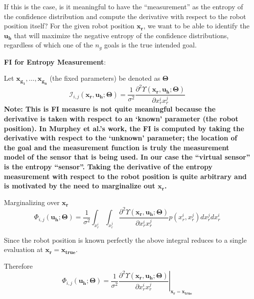 \documentclass[]{article}
\begin{document}
If this is the case, is it meaningful to have the ``measurement'' as the entropy of the confidence distribution and compute the derivative with respect to the robot position itself? For the given robot position $\boldsymbol{x_r}$, we want to be able to identify the $\boldsymbol{u_h}$ that will maximize the negative entropy of the confidence distributions, regardless of which one of the $n_g$ goals is the true intended goal. 

\noindent\textbf{FI for Entropy Measurement}:

Let $\boldsymbol{x_{g_1}},\dots,\boldsymbol{x_{g_n}}$ (the fixed parameters) be denoted as $\boldsymbol{\Theta}$
\begin{equation*}
\mathcal{I}_{i,j}(\boldsymbol{x_r}, \boldsymbol{u_h}; \boldsymbol{\Theta}) = \frac{1}{\sigma^2}\frac{\partial^2\Upsilon(\boldsymbol{x_r}, \boldsymbol{u_h};\boldsymbol{\Theta})}{\partial x_r^ix_r^j}
\end{equation*}
\textbf{Note: This is FI measure is not quite meaningful because the derivative is taken with respect to an `known' parameter (the robot position). In Murphey et al.'s work, the FI is computed by taking the derivative with respect to the `unknown' parameter; the location of the goal and the measurement function is truly the measurement model of the sensor that is being used. In our case the ``virtual sensor'' is the entropy ``sensor''. Taking the derivative of the entropy measurement with respect to the robot position is quite arbitrary and is motivated by the need to marginalize out $\boldsymbol{x_r}$. }

\noindent Marginalizing over $\boldsymbol{x_r}$
\begin{equation*}
\Phi_{i,j}(\boldsymbol{u_h};\boldsymbol{\Theta}) = \frac{1}{\sigma^2}\int_{x_{r}^i}\int_{x_{r}^j}\frac{\partial^2\Upsilon(\boldsymbol{x_r}, \boldsymbol{u_h}; \boldsymbol{\Theta})}{\partial x_{r}^ix_{r}^j}p(x_{r}^i, x_{r}^j)dx_{r}^jdx_{r}^i
\end{equation*}

Since the robot position is known perfectly the above integral reduces to a single evaluation at $\boldsymbol{x_r} = \boldsymbol{x_{true}}$. 

Therefore
\begin{equation*}
\Phi_{i,j}(\boldsymbol{u_h};\boldsymbol{\Theta}) = \left.\frac{1}{\sigma^2}\frac{\partial^2\Upsilon(\boldsymbol{x_r}, \boldsymbol{u_h}; \boldsymbol{\Theta})}{\partial x_{r}^ix_{r}^j}\right\vert_{\boldsymbol{x_r} = \boldsymbol{x_{true}}}
\end{equation*}
\end{document}
